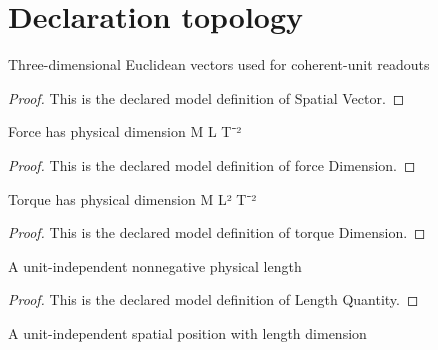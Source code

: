 \section{Declaration topology}
\begin{definition}
  \label{def:physics:phyx-mini-0823:phyxminiproblems-problemphyxmini0823-spatialvector}
  Three-dimensional Euclidean vectors used for coherent-unit readouts
\end{definition}
\begin{proof}
  This is the declared model definition of Spatial Vector.
\end{proof}
\begin{definition}
  \label{def:physics:phyx-mini-0823:phyxminiproblems-problemphyxmini0823-forcedimension}
  Force has physical dimension M L T⁻²
\end{definition}
\begin{proof}
  This is the declared model definition of force Dimension.
\end{proof}
\begin{definition}
  \label{def:physics:phyx-mini-0823:phyxminiproblems-problemphyxmini0823-torquedimension}
  Torque has physical dimension M L² T⁻²
\end{definition}
\begin{proof}
  This is the declared model definition of torque Dimension.
\end{proof}
\begin{definition}
  \label{def:physics:phyx-mini-0823:phyxminiproblems-problemphyxmini0823-lengthquantity}
  A unit-independent nonnegative physical length
\end{definition}
\begin{proof}
  This is the declared model definition of Length Quantity.
\end{proof}
\begin{definition}
  \label{def:physics:phyx-mini-0823:phyxminiproblems-problemphyxmini0823-positionvectorquantity}
  A unit-independent spatial position with length dimension
\end{definition}
